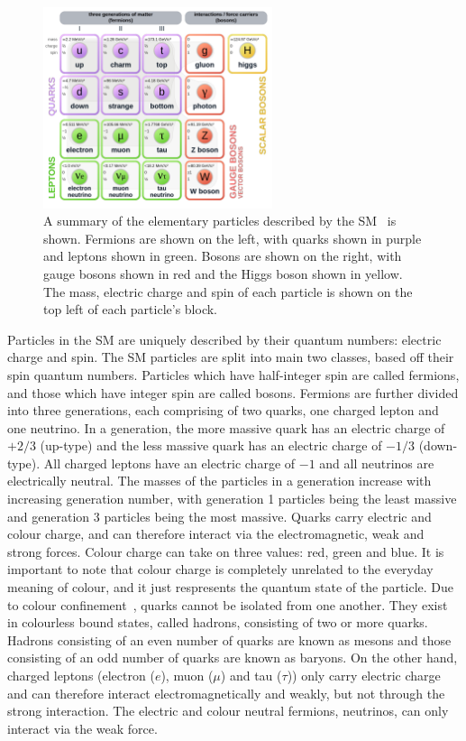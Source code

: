 \begin{figure}[h!]
\includegraphics[width=0.6\textwidth]{figures/theoryFigs/SM_particles.png}
\centering
\caption{A summary of the elementary particles described by the SM~\cite{SM-picture} is shown. Fermions are shown on the left, with quarks shown in purple and leptons shown in green. Bosons are shown on the right, with gauge bosons shown in red and the Higgs boson shown in yellow. The mass, electric charge and spin of each particle is shown on the top left of each particle's block.}
\label{fig:SM-particles}
\end{figure}
\noindent
Particles in the SM are uniquely described by their quantum numbers: electric charge and spin. The SM particles are split into main two classes, based off their spin quantum numbers. Particles which have half-integer spin are called fermions, and those which have integer spin are called bosons. Fermions are further divided into three generations, each comprising of two quarks, one charged lepton and one neutrino. In a generation, the more massive quark has an electric charge of $+2/3$ (up-type) and the less massive quark has an electric charge of $-1/3$ (down-type). All charged leptons have an electric charge of $-1$ and all neutrinos are electrically neutral. The masses of the particles in a generation increase with increasing generation number, with generation 1 particles being the least massive and generation 3 particles being the most massive. Quarks carry electric and colour charge, and can therefore interact via the electromagnetic, weak and strong forces. Colour charge can take on three values: red, green and blue. It is important to note that colour charge is completely unrelated to the everyday meaning of colour, and it just respresents the quantum state of the particle. Due to colour confinement~\cite{quark-confinement}, quarks cannot be isolated from one another. They exist in colourless bound states, called hadrons, consisting of two or more quarks. Hadrons consisting of an even number of quarks are known as mesons and those consisting of an odd number of quarks are known as baryons. On the other hand, charged leptons (electron ($e$), muon ($\mu$) and tau ($\tau$)) only carry electric charge and can therefore interact electromagnetically and weakly, but not through the strong interaction. The electric and colour neutral fermions, neutrinos, can only interact via the weak force.\\

